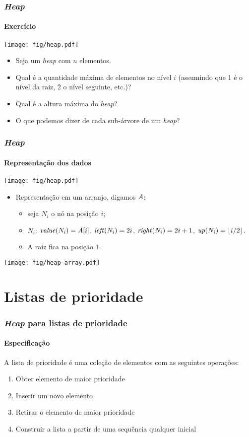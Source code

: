 \documentclass{beamer}
\begin{document}
\begin{frame}

  \frametitle{\textit{Heap}}
  \framesubtitle{Exercício}

{\center \texttt{[image: fig/heap.pdf]}}

\begin{itemize}
\item Seja um \textit{heap\/} com $n$ elementos.
\item Qual é a quantidade máxima de elementos no nível $i$ (assumindo que 1 é o nível da raiz, 2 o nível seguinte, etc.)?
\item Qual é a altura máxima do \textit{heap\/}?
\item O que podemos dizer de cada sub-árvore de um \textit{heap\/}?
\end{itemize}

\end{frame}

\begin{frame}

  \frametitle{\textit{Heap}}
  \framesubtitle{Representação dos dados}

{\center \texttt{[image: fig/heap.pdf]}}

\begin{itemize}
\item Representação em um arranjo, digamos $\id{A}$:
  \begin{itemize}
    \item seja $N_i$ o nó na posição $i$;
    \item $N_i$: $\id{value}(N_i) = \id{A}[i]$, $\id{left}(N_i) = 2i$, $\id{right}(N_i) = 2i+1$, $\id{up}(N_i) = \lfloor i / 2 \rfloor$.
    \item A raiz fica na posição $1$.
  \end{itemize}
\end{itemize}

{\center \texttt{[image: fig/heap-array.pdf]}}
\end{frame}

\section{Listas de prioridade}

\begin{frame}

  \frametitle{\textit{Heap} para listas de prioridade}
  \framesubtitle{Especificação}

A lista de prioridade é uma coleção de elementos com as seguintes operações:
\begin{enumerate}
\item Obter elemento de maior prioridade
\item Inserir um novo elemento
\item Retirar o elemento de maior prioridade
\item Construir a lista a partir de uma sequência qualquer inicial
\end{enumerate}

\end{frame}
\end{document}
